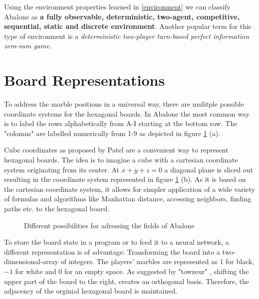 Using the environment properties learned in \ref{environment} we can classify Abalone as \textbf{a fully observable, deterministic, two-agent, competitive, sequential, static and discrete environment}. Another popular term for this type of environment is a \textit{deterministic two-player  turn-based perfect information zero-sum game}.

\section{Board Representations}
\label{board_representations}

To address the marble positions in a universal way, there are mulitple possible coordinate systems for the hexagonal boards. In Abalone the most common way is to label the rows alphabetically from A-I starting at the bottom row. The "colomns" are labelled numerically from 1-9 as depicted in figure \ref{abalone_coordinate_systems} (a).

Cube coordinates  as proposed by Patel \cite{noauthor_red_nodate} are a convenient way to represent hexagonal boards. The idea is to imagine a cube with a cartesian coordinate system originating from its center. At $x + y + z = 0$ a diagonal plane is sliced out resulting in the coordinate system represented in figure \ref{abalone_coordinate_systems} (b). As it is based on the cartesian coordinate system, it allows for simpler application of a wide variety of formulas and algorithms like Manhattan distance, accessing neighbors, finding paths etc. to the hexagonal board.

\begin{figure}[!h]
    \centering
    \caption{Different possibilities for adressing the fields of Abalone}
    \label{abalone_coordinate_systems}
\end{figure}

To store the board state in a program or to feed it to a neural network, a different representation is of advantage: Transforming the board into a two-dimensional-array of integers. The players' marbles are represented as $1$ for black, $-1$ for white and 0 for an empty space. As suggested by "towzeur" \cite{towzeur_towzeurgym-abalone_2021}, shifting the upper part of the board to the right, creates an orthogonal basis. Therefore, the adjacency of the orginial hexagonal board is maintained.

